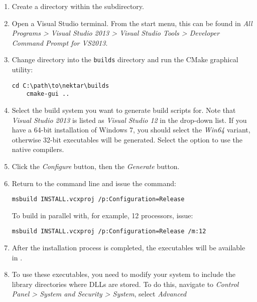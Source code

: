 \begin{enumerate}
  \begin{notebox}
    Some Windows versions do not recognise the path of a folder which has
    \inltt{++} in the name. If you think that your Windows version can not
    handle path containing special characters, you should rename
     to .
  \end{notebox}
  \item Create a  directory within the 
  subdirectory.
  \item Open a Visual Studio terminal. From the start menu, this can be found in
  \emph{All Programs > Visual Studio 2013 > Visual Studio Tools > Developer
    Command Prompt for VS2013}.
  \item Change directory into the \texttt{builds} directory and run the CMake
  graphical utility:
  \begin{lstlisting}[style=BashInputStyle]
    cd C:\path\to\nektar\builds
    cmake-gui ..
  \end{lstlisting}
  \item Select the build system you want to generate build scripts for. Note
  that \emph{Visual Studio 2013} is listed as \emph{Visual Studio 12} in the
  drop-down list. If you have a 64-bit installation of Windows 7, you should
  select the \emph{Win64} variant, otherwise 32-bit executables will be
  generated. Select the option to use the native compilers.
  \item Click the \emph{Configure} button, then the \emph{Generate} button.
  \item Return to the command line and issue the command:
  \begin{lstlisting}[style=BashInputStyle]
    msbuild INSTALL.vcxproj /p:Configuration=Release
  \end{lstlisting}
  To build in parallel with, for example, 12 processors, issue:
  \begin{lstlisting}[style=BashInputStyle]
    msbuild INSTALL.vcxproj /p:Configuration=Release /m:12
  \end{lstlisting}
  \item After the installation process is completed, the executables will be
  available in .
  \item To use these executables, you need to modify your system  to
  include the library directories where DLLs are stored. To do this, navigate to
  \emph{Control Panel > System and Security > System}, select \emph{Advanced
}
\end{enumerate}
